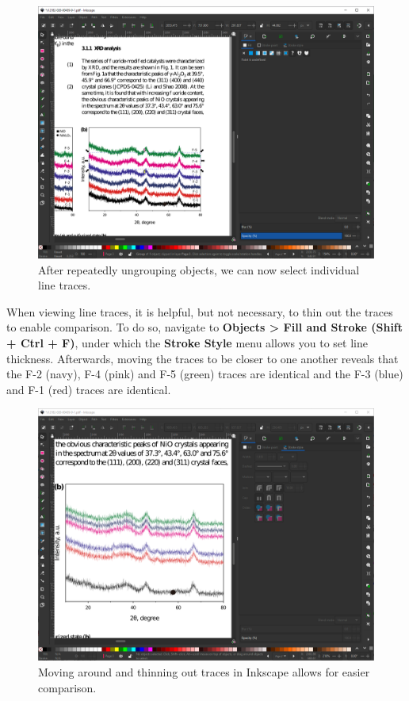 \documentclass[letterpaper, 12pt]{article}
\begin{document}
\begin{figure}[h!tbp]
    \includegraphics[width=\textwidth]{img/vector/in_inkscape_individual_traces.png}
    \caption*{After repeatedly ungrouping objects, we can now select individual line traces.}
\end{figure}

\pagebreak
When viewing line traces, it is helpful, but not necessary, to thin out the traces to enable comparison. To do so, navigate to \textbf{Objects > Fill and Stroke (Shift + Ctrl + F)}, under which the \textbf{Stroke Style} menu allows you to set line thickness. Afterwards, moving the traces to be closer to one another reveals that the F-2 (navy), F-4 (pink) and F-5 (green) traces are identical and the F-3 (blue) and F-1 (red) traces are identical.

\begin{figure}[h!tbp]
    \includegraphics[width=\textwidth]{img/vector/in_inkscape_individual_traces_thinned.png}
    \caption*{Moving around and thinning out traces in Inkscape allows for easier comparison.}
\end{figure}
\end{document}
